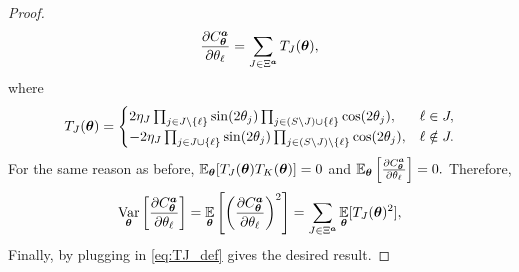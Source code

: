 \documentclass{article}
\theoremstyle{plain}
\theoremstyle{definition}
\theoremstyle{remark}
\begin{document}
\begin{proof}
\begin{equation}
\frac{\partial C^{\bm{a}}_{\bm{\theta}}}{\partial\theta_\ell}
=
\sum_{J\in\Xi^{\bm{a}}} T_J({\bm{\theta}}),
\end{equation}
where
\begin{equation}
T_J({\bm{\theta}})
=
\begin{cases}
2 \eta_J\prod_{j\in J\setminus\{\ell\}}\sin(2\theta_j)\prod_{j\in (S\setminus J) \cup \{\ell\}}\cos(2\theta_j), & \ell\in J,\\
-2 \eta_J \prod_{j\in J\cup \{\ell \}}\sin(2\theta_j)\prod_{j\in (S\setminus J)\setminus\{\ell\}}\cos(2\theta_j), & \ell\notin J.
\end{cases}
\label{eq:TJ_def}
\end{equation}
For the same reason as before, $\operatorname*{\mathbb{E}}_{{\bm{\theta}}}[T_J({\bm{\theta}})T_K({\bm{\theta}})] = 0 $ and  $\operatorname*{\mathbb{E}}_{{\bm{\theta}}} \left[ \frac{\partial C^{\bm{a}}_{\bm{\theta}}}{\partial\theta_\ell}\right] = 0.$
Therefore,
\begin{equation}
\operatorname*{Var}_{{\bm{\theta}}}\left[\frac{\partial C^{\bm{a}}_{\bm{\theta}}}{\partial\theta_\ell}\right]
=
\operatorname*{\mathbb{E}}_{{\bm{\theta}}}\left[\left(\frac{\partial C^{\bm{a}}_{\bm{\theta}}}{\partial\theta_\ell}\right)^2\right]
=
\sum_{J\in \Xi^{\bm{a}}}\operatorname*{\mathbb{E}}_{{\bm{\theta}}}[T_J({\bm{\theta}})^2],
\label{eq: symmetric derivative variance}
\end{equation}
Finally, by plugging in \cref{eq:TJ_def} gives the desired result.
\end{proof}
\end{document}

